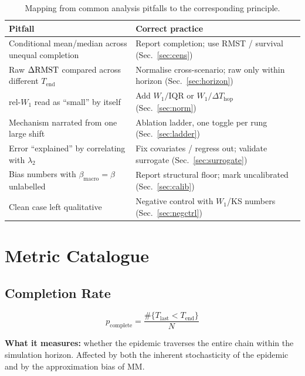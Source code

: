 \documentclass[11pt,a4paper]{article}
\begin{document}
\begin{table}[H]
\centering
\renewcommand{\arraystretch}{1.3}
\begin{tabular}{p{6.2cm}p{7.4cm}}
\toprule
\textbf{Pitfall} & \textbf{Correct practice} \\
\midrule
Conditional mean/median across unequal completion & Report completion; use RMST / survival (Sec.~\ref{sec:cens}) \\
Raw $\Delta\mathrm{RMST}$ compared across different $T_{\mathrm{end}}$ & Normalise cross-scenario; raw only within horizon (Sec.~\ref{sec:horizon}) \\
rel-$W_1$ read as ``small'' by itself & Add $W_1/\mathrm{IQR}$ or $W_1/\Delta T_{\mathrm{hop}}$ (Sec.~\ref{sec:norm}) \\
Mechanism narrated from one large shift & Ablation ladder, one toggle per rung (Sec.~\ref{sec:ladder}) \\
Error ``explained'' by correlating with $\lambda_2$ & Fix covariates / regress out; validate surrogate (Sec.~\ref{sec:surrogate}) \\
Bias numbers with $\beta_{\mathrm{macro}}=\beta$ unlabelled & Report structural floor; mark uncalibrated (Sec.~\ref{sec:calib}) \\
Clean case left qualitative & Negative control with $W_1$/KS numbers (Sec.~\ref{sec:negctrl}) \\
\bottomrule
\end{tabular}
\caption{Mapping from common analysis pitfalls to the corresponding principle.}
\label{tab:pitfalls}
\end{table}

\section{Metric Catalogue}
\label{sec:catalogue}

\subsection{Completion Rate}

\[
  p_{\mathrm{complete}} = \frac{\#\{T_{\mathrm{last}} < T_{\mathrm{end}}\}}{N}
\]

\textbf{What it measures:} whether the epidemic traverses the entire chain
within the simulation horizon.  Affected by both the inherent stochasticity of
the epidemic and by the approximation bias of MM.
\end{document}
